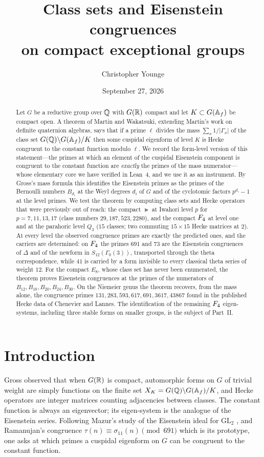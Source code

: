 \documentclass[11pt]{amsart}
\title[Class sets and Eisenstein congruences, I]{Class sets and Eisenstein congruences\\ on compact exceptional groups}
\author{Christopher Younge}\thanks{Working draft, not for circulation.}
\date{September 27, 2026}
\theoremstyle{definition}
\begin{document}
\begin{abstract}
Let $G$ be a reductive group over $\mathbb{Q}$ with $G(\mathbb{R})$ compact and let $K\subset G(\mathbb{A}_f)$ be compact open. A theorem of Martin and Wakatsuki, extending Martin's work on definite quaternion algebras, says that if a prime $\ell$ divides the mass $\sum_x1/|\Gamma_x|$ of the class set $G(\mathbb{Q})\backslash G(\mathbb{A}_f)/K$ then some cuspidal eigenform of level $K$ is Hecke congruent to the constant function modulo $\ell$. We record the form-level version of this statement---the primes at which an element of the cuspidal Eisenstein component is congruent to the constant function are \emph{exactly} the primes of the mass numerator---whose elementary core we have verified in Lean~4, and we use it as an instrument. By Gross's mass formula this identifies the Eisenstein primes as the primes of the Bernoulli numbers $B_{d_i}$ at the Weyl degrees $d_i$ of $G$ and of the cyclotomic factors $p^{d_i}-1$ at the level primes. We test the theorem by computing class sets and Hecke operators that were previously out of reach: the compact $\Gt$ at Iwahori level $p$ for $p=7,11,13,17$ (class numbers $29,187,523,2280$), and the compact $F_4$ at level one and at the parahoric level $Q_3$ ($15$ classes; two commuting $15\times15$ Hecke matrices at $2$). At every level the observed congruence primes are exactly the predicted ones, and the carriers are determined: on $F_4$ the primes $691$ and $73$ are the Eisenstein congruences of $\Delta$ and of the newform in $S_{12}(\Gamma_0(3))$, transported through the theta correspondence, while $41$ is carried by a form invisible to every classical theta series of weight $12$. For the compact $E_8$, whose class set has never been enumerated, the theorem proves Eisenstein congruences at the primes of the numerators of $B_{12},B_{18},B_{20},B_{24},B_{30}$. On the Niemeier genus the theorem recovers, from the mass alone, the congruence primes $131,283,593,617,691,3617,43867$ found in the published Hecke data of Chenevier and Lannes. The identification of the remaining $F_4$ eigen-systems, including three stable forms on smaller groups, is the subject of Part~II.
\end{abstract}
\maketitle
\section{Introduction}
Gross \cite{Gross-AMF} observed that when $G(\mathbb{R})$ is compact, automorphic forms on $G$ of trivial weight are simply functions on the finite set $X_K=G(\mathbb{Q})\backslash G(\mathbb{A}_f)/K$, and Hecke operators are integer matrices counting adjacencies between classes. The constant function is always an eigenvector; its eigen-system is the analogue of the Eisenstein series. Following Mazur's study of the Eisenstein ideal for $\mathrm{GL}_2$ \cite{Mazur}, and Ramanujan's congruence $\tau(n)\equiv\sigma_{11}(n)\pmod{691}$ which is its prototype, one asks at which primes a cuspidal eigenform on $G$ can be congruent to the constant function.
\end{document}
